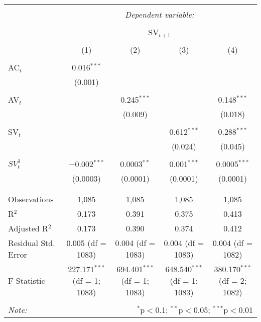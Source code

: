 
\begin{table}[!htbp] \centering 
  \caption{} 
  \label{} 
\begin{tabular}{@{\extracolsep{5pt}}lcccc} 
\\[-1.8ex]\hline 
\hline \\[-1.8ex] 
 & \multicolumn{4}{c}{\textit{Dependent variable:}} \\ 
\cline{2-5} 
\\[-1.8ex] & \multicolumn{4}{c}{SV$_{t+1}$} \\ 
\\[-1.8ex] & (1) & (2) & (3) & (4)\\ 
\hline \\[-1.8ex] 
 AC$_{t}$ & 0.016$^{***}$ &  &  &  \\ 
  & (0.001) &  &  &  \\ 
  & & & & \\ 
 AV$_{t}$ &  & 0.245$^{***}$ &  & 0.148$^{***}$ \\ 
  &  & (0.009) &  & (0.018) \\ 
  & & & & \\ 
 SV$_{t}$ &  &  & 0.612$^{***}$ & 0.288$^{***}$ \\ 
  &  &  & (0.024) & (0.045) \\ 
  & & & & \\ 
 $SV^{1}_{t}$ & $-$0.002$^{***}$ & 0.0003$^{**}$ & 0.001$^{***}$ & 0.0005$^{***}$ \\ 
  & (0.0003) & (0.0001) & (0.0001) & (0.0001) \\ 
  & & & & \\ 
\hline \\[-1.8ex] 
Observations & 1,085 & 1,085 & 1,085 & 1,085 \\ 
R$^{2}$ & 0.173 & 0.391 & 0.375 & 0.413 \\ 
Adjusted R$^{2}$ & 0.173 & 0.390 & 0.374 & 0.412 \\ 
Residual Std. Error & 0.005 (df = 1083) & 0.004 (df = 1083) & 0.004 (df = 1083) & 0.004 (df = 1082) \\ 
F Statistic & 227.171$^{***}$ (df = 1; 1083) & 694.401$^{***}$ (df = 1; 1083) & 648.540$^{***}$ (df = 1; 1083) & 380.170$^{***}$ (df = 2; 1082) \\ 
\hline 
\hline \\[-1.8ex] 
\textit{Note:}  & \multicolumn{4}{r}{$^{*}$p$<$0.1; $^{**}$p$<$0.05; $^{***}$p$<$0.01} \\ 
\end{tabular} 
\end{table} 
